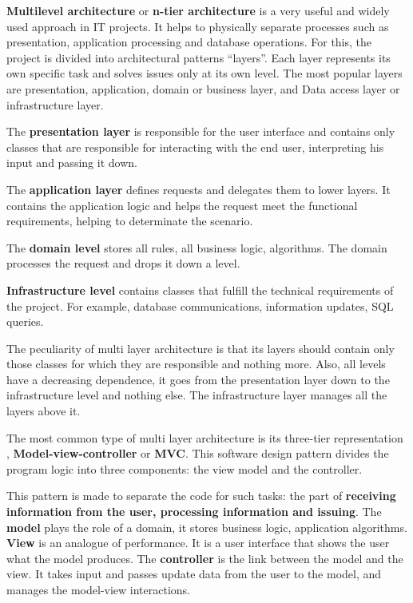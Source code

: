 
\textbf{Multilevel architecture} or \textbf{n-tier architecture} is a very useful and widely used approach in IT projects. It helps to physically separate processes such as presentation, application processing and database operations. For this, the project is divided into architectural patterns “layers”. Each layer represents its own specific task and solves issues only at its own level. The most popular layers are presentation, application, domain or business layer, and Data access layer or infrastructure layer.


The \textbf{presentation layer} is responsible for the user interface and contains only classes that are responsible for interacting with the end user, interpreting his input and passing it down.

The \textbf{application layer} defines requests and delegates them to lower layers. It contains the application logic and helps the request meet the functional requirements, helping to determinate the scenario. 

The \textbf{domain level} stores all rules, all business logic, algorithms. The domain processes the request and drops it down a level.

\textbf{Infrastructure level} contains classes that fulfill the technical requirements of the project. For example, database communications, information updates, SQL queries. 

The peculiarity of multi layer architecture is that its layers should contain only those classes for which they are responsible and nothing more. Also, all levels have a decreasing dependence, it goes from the presentation layer down to the infrastructure level and nothing else. The infrastructure layer manages all the layers above it.

The most common type of multi layer architecture is its three-tier representation , \textbf{Model-view-controller} or \textbf{MVC}. This software design pattern divides the program logic into three components: the view model and the controller.

This pattern is made to separate the code for such tasks: the part of \textbf{receiving information from the user, processing information and issuing}. The \textbf{model} plays the role of a domain, it stores business logic, application algorithms. \textbf{View} is an analogue of performance. It is a user interface that shows the user what the model produces. The \textbf{controller} is the link between the model and the view. It takes input and passes update data from the user to the model, and manages the model-view interactions.

